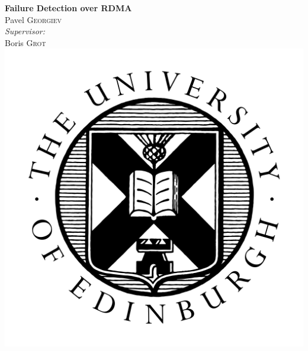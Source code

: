 \documentclass[12pt]{article}
\begin{document}
\begin{titlepage}

\newcommand{\HLine}{\rule{\linewidth}{0.3mm}} %

\center %
 


{ \huge \bfseries Failure Detection over RDMA}\\[2cm] %
 


\Large 
Pavel \textsc{Georgiev}\\[1cm]

\Large \emph{Supervisor:}\\
Boris \textsc{Grot}\\[1cm] 


\includegraphics[scale=0.6]{logo.png}\\[1cm] 
 

\end{titlepage}
\end{document}
